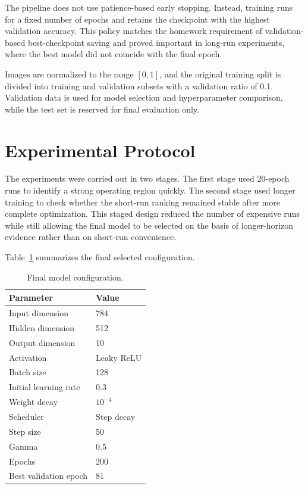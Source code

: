\documentclass[10pt,twocolumn]{article}
\begin{document}
The pipeline does not use patience-based early stopping. Instead, training runs for a fixed number of epochs and retains the checkpoint with the highest validation accuracy. This policy matches the homework requirement of validation-based best-checkpoint saving and proved important in long-run experiments, where the best model did not coincide with the final epoch.

Images are normalized to the range $[0,1]$, and the original training split is divided into training and validation subsets with a validation ratio of 0.1. Validation data is used for model selection and hyperparameter comparison, while the test set is reserved for final evaluation only.

\section{Experimental Protocol}
The experiments were carried out in two stages. The first stage used 20-epoch runs to identify a strong operating region quickly. The second stage used longer training to check whether the short-run ranking remained stable after more complete optimization. This staged design reduced the number of expensive runs while still allowing the final model to be selected on the basis of longer-horizon evidence rather than on short-run convenience.

Table~\ref{tab:final_config} summarizes the final selected configuration.

\begin{table}[H]
\centering
\caption{Final model configuration.}
\label{tab:final_config}
\begin{tabular}{ll}
\toprule
Parameter & Value \\
\midrule
Input dimension & 784 \\
Hidden dimension & 512 \\
Output dimension & 10 \\
Activation & Leaky ReLU \\
Batch size & 128 \\
Initial learning rate & 0.3 \\
Weight decay & $10^{-4}$ \\
Scheduler & Step decay \\
Step size & 50 \\
Gamma & 0.5 \\
Epochs & 200 \\
Best validation epoch & 81 \\
\bottomrule
\end{tabular}
\end{table}
\end{document}

